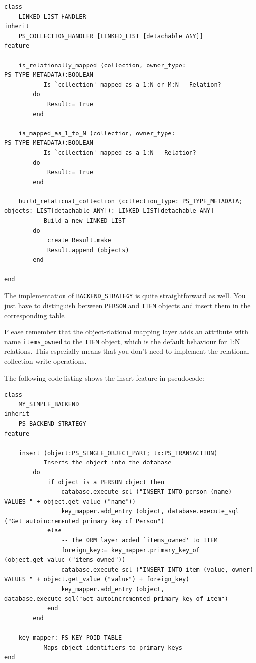 \begin{lstlisting}[language=OOSC2Eiffel, captionpos=b, caption={The collection handler for LINKED\_LIST}, label={lst:my_linked_list_collection_handler}]
class 
	LINKED_LIST_HANDLER
inherit
	PS_COLLECTION_HANDLER [LINKED_LIST [detachable ANY]]
feature

	is_relationally_mapped (collection, owner_type: PS_TYPE_METADATA):BOOLEAN
		-- Is `collection' mapped as a 1:N or M:N - Relation?
		do
			Result:= True
		end

	is_mapped_as_1_to_N (collection, owner_type: PS_TYPE_METADATA):BOOLEAN
		-- Is `collection' mapped as a 1:N - Relation?
		do
			Result:= True
		end

	build_relational_collection (collection_type: PS_TYPE_METADATA; objects: LIST[detachable ANY]): LINKED_LIST[detachable ANY]
		-- Build a new LINKED_LIST
		do
			create Result.make
			Result.append (objects)
		end

end
\end{lstlisting}


The implementation of \lstinline!BACKEND_STRATEGY! is quite straightforward as well.
You just have to distinguish between \lstinline!PERSON! and \lstinline!ITEM! objects and insert them in the corresponding table.

Please remember that the object-rlational mapping layer adds an attribute with name \lstinline!items_owned! to the \lstinline!ITEM! object, which is the default behaviour for 1:N relations.
This especially means that you don't need to implement the relational collection write operations.

The following code listing shows the insert feature in pseudocode:

\begin{lstlisting}[language=OOSC2Eiffel, captionpos=b, caption={The collection handler for LINKED\_LIST}, label={lst:my_backend_adaption}]
class 
	MY_SIMPLE_BACKEND
inherit
	PS_BACKEND_STRATEGY
feature

	insert (object:PS_SINGLE_OBJECT_PART; tx:PS_TRANSACTION)
		-- Inserts the object into the database
		do
			if object is a PERSON object then
				database.execute_sql ("INSERT INTO person (name) VALUES " + object.get_value ("name"))
				key_mapper.add_entry (object, database.execute_sql ("Get autoincremented primary key of Person")
			else
				-- The ORM layer added `items_owned' to ITEM
				foreign_key:= key_mapper.primary_key_of (object.get_value ("items_owned"))
				database.execute_sql ("INSERT INTO item (value, owner) VALUES " + object.get_value ("value") + foreign_key)
				key_mapper.add_entry (object, database.execute_sql("Get autoincremented primary key of Item")
			end
		end

	key_mapper: PS_KEY_POID_TABLE
		-- Maps object identifiers to primary keys
end
\end{lstlisting}

